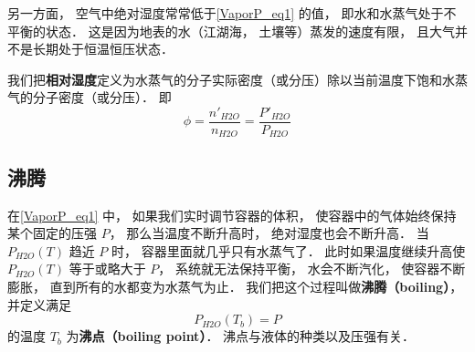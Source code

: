 另一方面， 空气中绝对湿度常常低于\autoref{VaporP_eq1} 的值， 即水和水蒸气处于不平衡的状态． 这是因为地表的水（江湖海， 土壤等）蒸发的速度有限， 且大气并不是长期处于恒温恒压状态．

我们把\textbf{相对湿度}定义为水蒸气的分子实际密度（或分压）除以当前温度下饱和水蒸气的分子密度（或分压）． 即
\begin{equation}
\phi = \frac{n'_{H2O}}{n_{H2O}} = \frac{P'_{H2O}}{P_{H2O}}
\end{equation}

\subsection{沸腾}
在\autoref{VaporP_eq1} 中， 如果我们实时调节容器的体积， 使容器中的气体始终保持某个固定的压强 $P$， 那么当温度不断升高时， 绝对湿度也会不断升高． 当 $P_{H2O}(T)$ 趋近 $P$ 时， 容器里面就几乎只有水蒸气了． 此时如果温度继续升高使 $P_{H2O}(T)$ 等于或略大于 $P$， 系统就无法保持平衡， 水会不断汽化， 使容器不断膨胀， 直到所有的水都变为水蒸气为止． 我们把这个过程叫做\textbf{沸腾（boiling）}， 并定义满足
\begin{equation}
P_{H2O}(T_b) = P
\end{equation}
的温度 $T_b$ 为\textbf{沸点（boiling point）}． 沸点与液体的种类以及压强有关．
